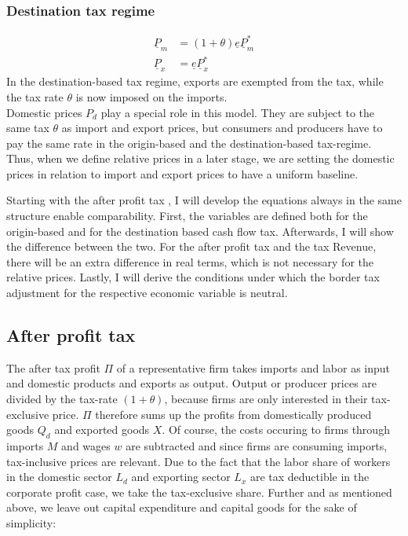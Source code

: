\subsubsection*{Destination tax regime}
\begin{equation}\label{D.Tax}
\begin{aligned}
\underline P_m &=  \left( 1+\theta \right) \underline e\underline P^*_m \\
\underline P_x &= \underline e \underline P^*_x 
\end{aligned}
\end{equation}
In the destination-based tax regime, exports are exempted from the tax, while the tax rate $\theta$ is now imposed on the imports.\\
Domestic prices $P_d$ play a special role in this model. They are subject to the same tax $\theta$ as import and export prices, but consumers and producers have to pay the same rate in the origin-based and the destination-based tax-regime. Thus, when we define relative prices in a later stage, we are setting the domestic prices in relation to import and export prices to have a uniform baseline. 


Starting with the after profit tax , I will develop the equations always in the same structure enable comparability. First, the variables are defined both for the origin-based and for the destination based cash flow tax. Afterwards, I will show the difference between the two. For the after profit tax and the tax Revenue, there will be an extra difference in real terms, which is not necessary for the relative prices. Lastly, I will derive the conditions under which the border tax adjustment for the respective economic variable is neutral. 


\subsection*{After profit tax}
The after tax profit $\Pi$ of a representative firm takes imports and labor as input and domestic products and exports as output. Output or producer prices are divided by the tax-rate $(1+\theta)$, because firms are only interested in their tax-exclusive price. $\Pi$ therefore sums up the profits from domestically produced goods $Q_d$ and exported goods $X$. Of course, the costs occuring to firms through imports $M$ and wages $w$ are subtracted and since firms are consuming imports, tax-inclusive prices are relevant. Due to the fact that the labor share of workers in the domestic sector $L_d$ and exporting sector $L_x$ are tax deductible in the corporate profit case, we take the tax-exclusive share. Further and as mentioned above, we leave out capital expenditure and capital goods for the sake of simplicity:


